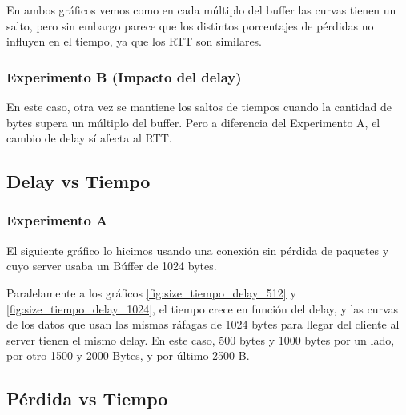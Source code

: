 

  En ambos gr\'aficos vemos como en cada m\'ultiplo del buffer las curvas tienen un salto, pero sin embargo parece que los distintos porcentajes de p\'erdidas no influyen en el tiempo, ya que los RTT son similares. 
  
\subsubsection{Experimento B (Impacto del delay)} 

  
  
  En este caso, otra vez se mantiene los saltos de tiempos cuando la cantidad de bytes supera un m\'ultiplo del buffer. Pero a diferencia del Experimento A, el cambio de delay s\'i afecta al RTT. 

\subsection{Delay vs Tiempo}
\subsubsection{Experimento A}

  El siguiente gr\'afico lo hicimos usando una conexi\'on sin p\'erdida de paquetes y cuyo server usaba un B\'uffer de 1024 bytes.


  Paralelamente a los gr\'aficos \ref{fig:size_tiempo_delay_512} y \ref{fig:size_tiempo_delay_1024}, el tiempo crece en funci\'on del delay, y las curvas de los datos que usan las mismas r\'afagas de 1024 bytes para llegar del cliente al server tienen el mismo delay. En este caso, 500 bytes y 1000 bytes por un lado, por otro 1500 y 2000 Bytes, y por \'ultimo 2500 B. 

\subsection{P\'erdida vs Tiempo}
